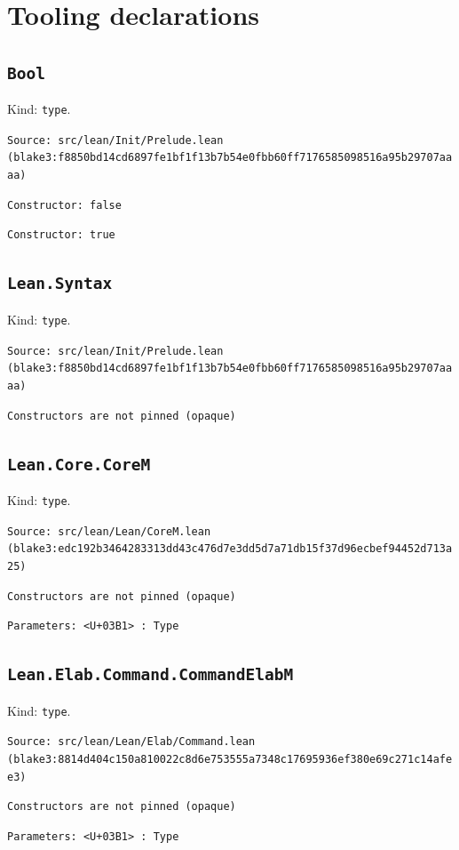 \documentclass[11pt]{article}
\begin{document}
\section*{Tooling declarations}
\subsection*{\texttt{Bool}}
\noindent Kind: \texttt{type}.\par
\noindent \texttt{Source: src/lean/Init/Prelude.lean (blake3:f8850bd14cd6897fe1bf1f13b7b54e0fbb60ff7176585098516a95b29707aaaa)}\par
\noindent \texttt{Constructor: false }\par
\noindent \texttt{Constructor: true }\par
\subsection*{\texttt{Lean.Syntax}}
\noindent Kind: \texttt{type}.\par
\noindent \texttt{Source: src/lean/Init/Prelude.lean (blake3:f8850bd14cd6897fe1bf1f13b7b54e0fbb60ff7176585098516a95b29707aaaa)}\par
\noindent \texttt{Constructors are not pinned (opaque)}\par
\subsection*{\texttt{Lean.Core.CoreM}}
\noindent Kind: \texttt{type}.\par
\noindent \texttt{Source: src/lean/Lean/CoreM.lean (blake3:edc192b3464283313dd43c476d7e3dd5d7a71db15f37d96ecbef94452d713a25)}\par
\noindent \texttt{Constructors are not pinned (opaque)}\par
\noindent \texttt{Parameters: <U+03B1> : Type}\par
\subsection*{\texttt{Lean.Elab.Command.CommandElabM}}
\noindent Kind: \texttt{type}.\par
\noindent \texttt{Source: src/lean/Lean/Elab/Command.lean (blake3:8814d404c150a810022c8d6e753555a7348c17695936ef380e69c271c14afee3)}\par
\noindent \texttt{Constructors are not pinned (opaque)}\par
\noindent \texttt{Parameters: <U+03B1> : Type}\par
\end{document}
